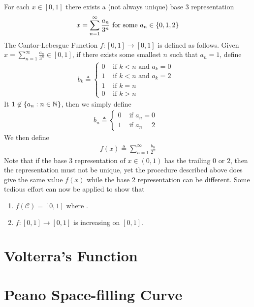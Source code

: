 \documentclass{report}
\begin{document}
\begin{mdframed}
For each $x\in [0,1]$ there exists a (not always unique) base 3 representation 
\begin{align*}
x=\sum_{n=1}^{\infty} \frac{a_n}{3^n}\text{ for some }a_n \in \{ 0,1,2 \}
\end{align*}
The Cantor-Lebesgue Function $f:[0,1]\rightarrow [0,1]$ is defined as follows. Given $x= \sum_{n=1}^{\infty} \frac{a_n}{3^n}\in [0,1]$, if there exists some smallest $n$ such that $a_n=1$, define 
\begin{align*}
b_k\triangleq \begin{cases}
  0& \text{ if $k<n$ and $a_k=0$ }\\
  1& \text{ if $k<n$ and  $a_k=2$ } \\
  1& \text{ if $k=n$ }\\
  0& \text{ if $k>n$ }
\end{cases}
\end{align*}
It $1\not\in \{ a_n: n\in\mathbb{N} \}$, then we simply define 
\begin{align*}
b_n\triangleq \begin{cases}
  0& \text{ if $a_n=0$ }\\
 1& \text{ if $a_n=2$ } 
\end{cases}
\end{align*}
We then define 
\begin{align*}
f(x)\triangleq \sum_{n=1}^{\infty} \frac{b_n}{2^n}
\end{align*}
Note that if the base 3 representation of $x\in (0,1)$ has the trailing  $0$ or $2$, then the representation must not be unique, yet the procedure described above does give the same value $f(x)$ while the base 2 representation can be different. Some tedious effort can now be applied to show that 
\begin{enumerate}[label=(\alph*)]
  \item $f(\mathcal{C})=[0,1]$ where .  
  \item $f:[0,1]\rightarrow [0,1]$ is increasing on $[0,1]$.
\end{enumerate}
\end{mdframed}
\section{Volterra's Function}
\section{Peano Space-filling Curve}
\end{document}
